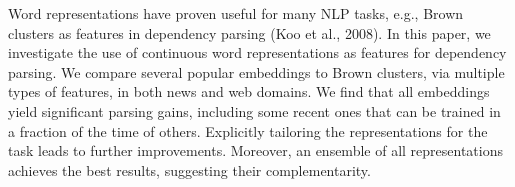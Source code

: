 Word representations have proven useful for many NLP tasks, e.g., Brown clusters as features in dependency parsing (Koo et al., 2008). In this paper, we investigate the use of continuous word representations as features for dependency parsing. We compare several popular embeddings to Brown clusters, via multiple types of features, in both news and web domains. We find that all embeddings yield significant parsing gains, including some recent ones that can be trained in a fraction of the time of others. Explicitly tailoring the representations for the task leads to further improvements. Moreover, an ensemble of all representations achieves the best results, suggesting their complementarity.
